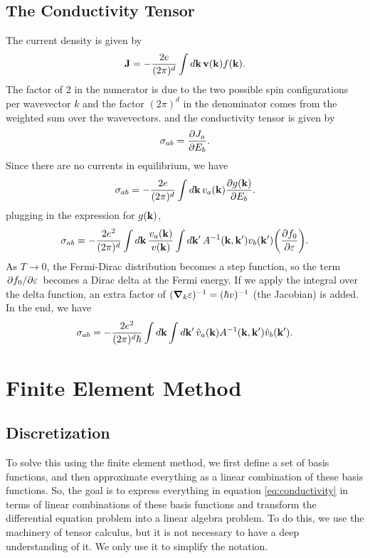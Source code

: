 \documentclass[12pt]{article}
\begin{document}
\subsection{The Conductivity Tensor}
The current density is given by
\begin{equation}
    \vb{J} = -\frac{2e}{(2\pi)^d} \int\dd{\vb{k}} \vb{v}(\vb{k}) f(\vb{k}).
\end{equation}
The factor of 2 in the numerator is due to the two possible spin configurations per wavevector $k$
and the factor $(2\pi)^d$ in the denominator comes from the weighted sum over the wavevectors.
and the conductivity tensor is given by
\begin{equation}
    \sigma_{ab} = \pdv{J_a}{E_b}.
\end{equation}
Since there are no currents in equilibrium, we have
\begin{equation}
    \sigma_{ab} = -\frac{2e}{(2\pi)^d} \int\dd{\vb{k}} v_a(\vb{k}) \pdv{g(\vb{k})}{E_b}.
\end{equation}
plugging in the expression for $g(\vb{k})$,
\begin{equation}
    \sigma_{ab} = -\frac{2e^2}{(2\pi)^d} \int\dd{\vb{k}} \frac{v_a(\vb{k})}{v(\vb{k})} \int\dd{\vb{k'}}
    A^{-1}(\vb{k}, \vb{k'}) v_b(\vb{k'})\qty(\pdv{f_0}{\varepsilon}).
\end{equation}
As $T\to0$, the Fermi-Dirac distribution becomes a step function, so the term
$\pdv*{f_0}{\varepsilon}$ becomes a Dirac delta at the Fermi energy. If we apply the integral over
the delta function, an extra factor of $(\grad_{k}\varepsilon)^{-1} = (\hbar v)^{-1}$ (the Jacobian)
is added. In the end, we have
\begin{equation}
    \sigma_{ab} = -\frac{2e^2}{(2\pi)^d\hbar} \int\dd{\vb{k}}\int\dd{\vb{k'}}
    \hat{v}_a(\vb{k}) A^{-1}(\vb{k}, \vb{k'}) \hat{v}_b(\vb{k'}).
    \label{eq:conductivity}
\end{equation}

\section{Finite Element Method}
\subsection{Discretization}
To solve this using the finite element method, we first define a set of basis functions, and then
approximate everything as a linear combination of these basis functions. So, the goal is to express
everything in equation \eqref{eq:conductivity} in terms of linear combinations of these basis
functions and transform the differential equation problem into a linear algebra problem. To do this,
we use the machinery of tensor calculus, but it is not necessary to have a deep understanding of it.
We only use it to simplify the notation.
\end{document}

